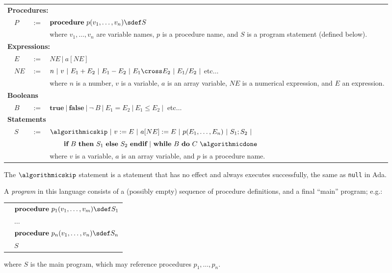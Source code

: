 \begin{tabular}{lllp{13cm}}
\multicolumn{4}{l}{\textbf{Procedures:}}\\
 & $P$ & $:=$ & $\algorithmicprocedure~p(v_1,\ldots,v_n) \sdef S$\\[1mm]
 &     &      & where $v_1, \ldots, v_n$ are variable names, $p$ is a procedure name, and $S$ is a program statement (defined below).\\[3mm]
\multicolumn{4}{l}{\textbf{Expressions:}}\\
 & $E$  & $:=$ & $NE ~|~ a[NE]$\\
 & $NE$ & $:=$ & $n ~|~ v ~|~ E_1 + E_2 ~|~ E_1 - E_2 ~|~ E_1 \cross E_2 ~|~ E_1 / E_2 ~|~ $etc$\ldots$ \\[1mm]
 &   & & where $n$ is a number, $v$ is a variable, $a$ is an array variable, $NE$ is a numerical expression, and $E$ an expression.\\[3mm]
\multicolumn{4}{l}{\textbf{Booleans}}\\
 & $B$  & $:=$ &  $\textbf{true} ~|~ \textbf{false} ~|~ \neg~B ~|~ E_1 = E_2 ~|~ E_1 \leq E_2 ~|~ $ etc$\ldots$\\[3mm]
\multicolumn{4}{l}{\textbf{Statements}}\\
 & $S$  & $:=$ & $\algorithmicskip ~|~ v := E ~|~ a[NE] := E ~|~ p(E_1,\ldots,E_n) ~|~ S_1 ; S_2 ~|~$\\
 &      &      & $~~~~~~\algorithmicif~B~\algorithmicthen~S_1 ~\algorithmicelse~ S_2 ~\algorithmicend\algorithmicif ~|~ \algorithmicwhile~ B ~\algorithmicdo~ C ~\algorithmicdone~$\\[1mm]
 & & & where $v$ is a variable, $a$ is an array variable, and $p$ is a procedure name.
\end{tabular}

The $\algorithmicskip$ statement is a statement that has no effect and always executes successfully, the same as \texttt{null} in Ada.

A \emph{program} in this language consists of a (possibly empty) sequence of procedure definitions, and a final ``main'' program; e.g.:

\begin{tabular}{ll}
 & $\algorithmicprocedure~p_1(v_1,\ldots,v_m) \sdef S_1$\\
 & $\ldots$\\
 & $\algorithmicprocedure~p_n(v_1,\ldots,v_n) \sdef S_n$\\[1mm]
 & $S$
\end{tabular}

where $S$ is the main program, which may reference procedures $p_1,\ldots, p_n$.

